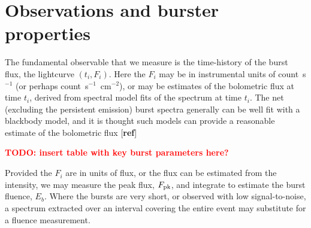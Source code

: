 \documentclass{aastex63}
\newcommand\latex{La\TeX}
\newcommand{\todo}[1]{\textbf{\textcolor{red}{TODO: #1}}} %
\begin{document}

\section{Observations and burster properties} 
\label{sec:data}


\label{subsec:data}

The fundamental observable that we measure is the time-history of the burst flux, the lightcurve $(t_i,F_{i})$. Here the $F_{i}$ may be in instrumental units of count~s$^{-1}$ (or perhaps count~s$^{-1}$~cm$^{-2}$), or may be estimates of the bolometric flux at time $t_i$, derived from spectral model fits of the spectrum at time $t_i$.
%
The net (excluding the persistent emission) burst spectra generally can be well fit with a blackbody model, and it is thought such models can provide a reasonable estimate of the bolometric flux [{\bf ref}]

\todo{insert table with key burst parameters here? }


Provided the $F_i$ are in units of flux, or the flux can be estimated from the intensity,  we may measure the peak flux, $F_{\rm pk}$, and integrate to estimate the burst fluence, $E_b$. 
%
Where the bursts are very short, or observed with low signal-to-noise, a spectrum extracted over an interval covering the entire event may substitute for a fluence measurement.
\end{document}
